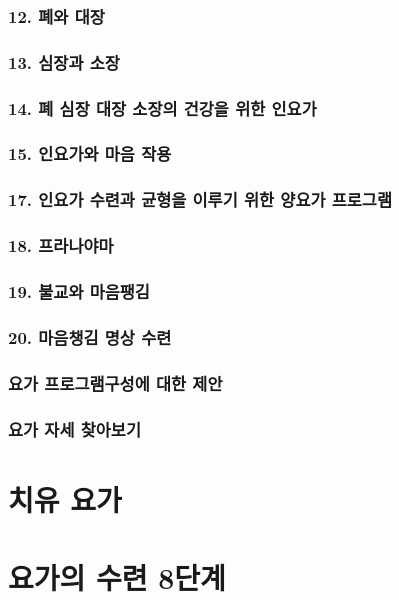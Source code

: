 \documentclass[12pt, a4paper, oneside]{book}
\begin{document}
	\subsection{12. 폐와 대장}
	\subsection{13. 심장과 소장}
	\subsection{14. 폐 심장 대장 소장의 건강을 위한 인요가}
	\subsection{15. 인요가와 마음 작용}
	\subsection{17. 인요가 수련과 균형을 이루기 위한 양요가 프로그램}
	\subsection{18. 프라나야마}
	\subsection{19. 불교와 마음팽김}
	\subsection{20. 마음챙김 명상 수련}
	\subsection{요가 프로그램구성에 대한 제안}
	\subsection{요가 자세 찾아보기}




	\chapter{치유 요가}
	\minitoc	


	\chapter{요가의 수련 8단계}
	\minitoc	
\end{document}
